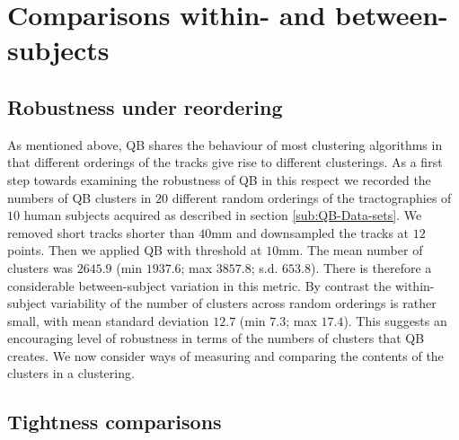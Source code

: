 \documentclass[preprint,authoryear,a4paper,10pt,onecolumn]{elsarticle}
\begin{document}
\section{\label{sub:Comparisons}Comparisons within- and between-subjects}

\subsection{Robustness under reordering}

As mentioned above, QB shares the behaviour of most clustering
algorithms in that different orderings of the tracks give rise to
different clusterings.  As a first step towards examining the robustness
of QB in this respect we recorded the numbers of QB clusters in $20$
different random orderings of the tractographies of $10$ human subjects
acquired as described in section \ref{sub:QB-Data-sets}. We removed
short tracks shorter than $40$mm and downsampled the tracks at $12$
points. Then we applied QB with threshold at $10$mm. The mean number of
clusters was $2645.9$ (min $1937.6$; max $3857.8$; s.d. $653.8$). There
is therefore a considerable between-subject variation in this metric. By
contrast the within-subject variability of the number of clusters across
random orderings is rather small, with mean standard deviation $12.7$
(min $7.3$; max $17.4$). This suggests an encouraging level of
robustness in terms of the numbers of clusters that QB creates. We now
consider ways of measuring and comparing the contents of the clusters in
a clustering.


\subsection{Tightness comparisons\label{sub:Tightness-comparisons-1}}
\end{document}
